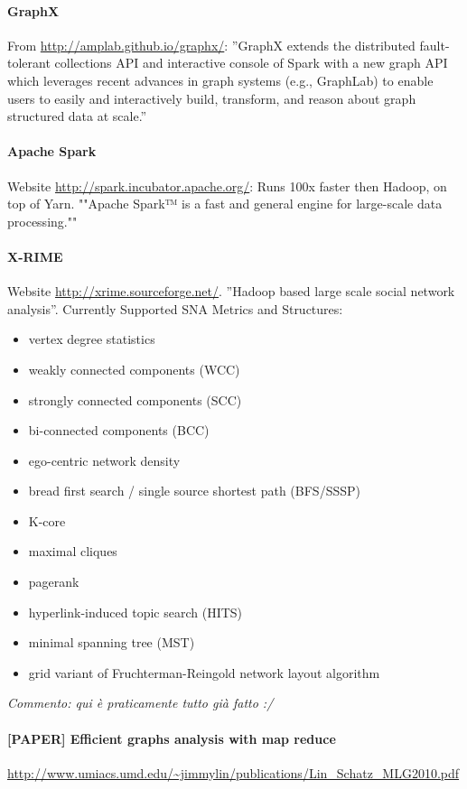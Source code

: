 \documentclass[10pt,a4paper]{article}
\begin{document}
\paragraph{GraphX} From \url{http://amplab.github.io/graphx/}: ''GraphX extends the distributed fault-tolerant collections API and interactive console of Spark with a new graph API which leverages recent advances in graph systems (e.g., GraphLab) to enable users to easily and interactively build, transform, and reason about graph structured data at scale.''

\paragraph{Apache Spark} Website \url{http://spark.incubator.apache.org/}: Runs 100x faster then Hadoop, on top of Yarn. ""Apache Spark™ is a fast and general engine for large-scale data processing.""

\paragraph{X-RIME} Website \url{http://xrime.sourceforge.net/}. ''Hadoop based large scale social network analysis''.
Currently Supported SNA Metrics and Structures:
\begin{itemize}
\item vertex degree statistics
   \item  weakly connected components (WCC)
   \item  strongly connected components (SCC)
   \item  bi-connected components (BCC)
    \item ego-centric network density
    \item bread first search / single source shortest path (BFS/SSSP)
    \item K-core
    \item maximal cliques
    \item pagerank
    \item hyperlink-induced topic search (HITS)
    \item minimal spanning tree (MST)
    \item grid variant of Fruchterman-Reingold network layout algorithm
\end{itemize}

\textit{Commento: qui è praticamente tutto già fatto :/}

\paragraph{[PAPER] Efficient graphs analysis with map reduce} \url{http://www.umiacs.umd.edu/~jimmylin/publications/Lin_Schatz_MLG2010.pdf}
\end{document}
